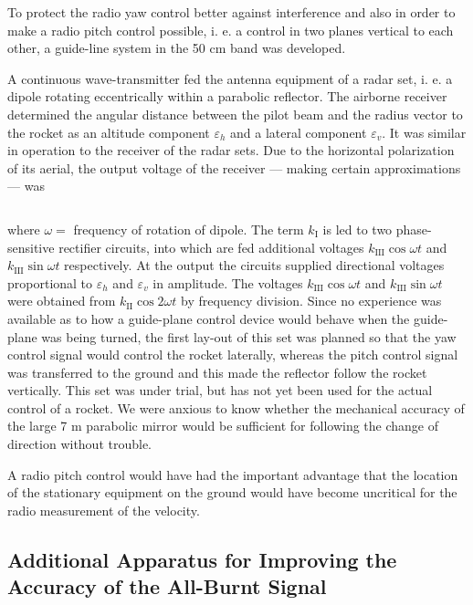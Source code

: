 \documentclass[12pt, a4paper]{article}
\begin{document}
To protect the radio yaw control better against interference and also in order to make a radio pitch control possible, i. e. a control in two planes vertical to each other, a guide-line system in the 50 cm band was developed.

A continuous wave-transmitter fed the antenna equipment of a radar set, i. e.
a dipole rotating eccentrically within a parabolic reflector. The airborne
receiver determined the angular distance between the pilot beam and the radius
vector to the rocket as an altitude component $\varepsilon_{h}$ and a lateral component $\varepsilon_{v}$. It was similar in operation to the receiver of the radar sets. Due to the horizontal polarization of its aerial, the output voltage of the receiver — making certain approximations — was

\begin{equation}
\end{equation}

where $\omega=$ frequency of rotation of dipole. The term $k_{\text{I}}$ is led to two phase- sensitive rectifier circuits, into which are fed additional voltages $k_{\text{III}}\cos\omega t$ and  $k_{\text{III}}\sin\omega t$ respectively. At the output the circuits supplied directional voltages proportional to $\varepsilon_{h}$ and $\varepsilon_{v}$ in amplitude. The voltages $k_{\text{III}}\cos\omega t$ and $k_{\text{III}}\sin\omega t$ were obtained from $k_{\text{II}}\cos2\omega t$  by frequency division. Since no experience was available as to how a guide-plane control device would behave when the guide-plane was being turned, the first lay-out of this set was planned so that the yaw control signal would control the rocket laterally, whereas the pitch control signal was transferred to the ground and this made the reflector follow the rocket vertically. This set was under trial, but has not yet been used for the actual control of a rocket. We were anxious to know whether the mechanical accuracy of the large 7 m parabolic mirror would be sufficient for following the change of direction without trouble.

A radio pitch control would have had the important advantage that the location of the stationary equipment on the ground would have become uncritical for the radio measurement of the velocity.

\subsection{Additional Apparatus for Improving the Accuracy of the All-Burnt Signal}
\end{document}
